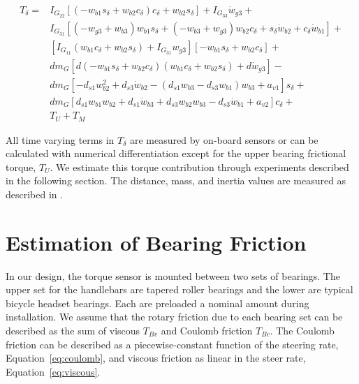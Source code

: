 \documentclass[a4paper]{article}
\begin{document}
\begin{align}
  T_{\delta} =
    & I_{G_{22}} \left[ \left( -w_{b1} s_\delta + w_{b2} c_\delta \right)
      c_\delta + w_{b2} s_\delta \right] + I_{G_{33}} \dot{w}_{g3} + \nonumber \\
    & I_{G_{31}} \left[ (-w_{g3} + w_{b3} ) w_{b1} s_\delta +
      (-w_{b3} + w_{g3}) w_{b2} c_\delta +
      s_\delta \dot{w}_{b2} + c_\delta \dot{w}_{b1} \right] + \nonumber \\
    & \left[ I_{G_{11}} (w_{b1} c_\delta + w_{b2}s_\delta) +
      I_{G_{31}} w_{g3} \right] \left[-w_{b1} s_\delta +
      w_{b2} c_\delta \right] + \nonumber \\
    & d m_G \left[ d (-w_{b1} s_\delta + w_{b2} c_\delta)
      (w_{b1} c_\delta + w_{b2} s_\delta) + d \dot{w}_{g3} \right] - \nonumber \\
    & d m_G \left[-d_{s1} w_{b2}^{2} + d_{s3} \dot{w}_{b2} -
      (d_{s1} w_{b3} - d_{s3} w_{b1}) w_{b3} + a_{v1} \right] s_\delta + \nonumber \\
    & d m_G \left[d_{s1} w_{b1} w_{b2} + d_{s1} \dot{w}_{b3} +
      d_{s3} w_{b2} w_{b3} - d_{s3} \dot{w}_{b1} + a_{v2} \right]
      c_\delta + \nonumber \\
    & T_U + T_M
\end{align}

All time varying terms in $T_\delta$ are measured by on-board sensors or can be
calculated with numerical differentiation except for the upper bearing
frictional torque, $T_U$. We estimate this torque contribution through
experiments described in the following section. The distance, mass, and inertia
values are measured as described in \cite{Moore2012}.

\section*{Estimation of Bearing Friction}
\label{sec:bearing-friction}

In our design, the torque sensor is mounted between two sets of bearings. The
upper set for the handlebars are tapered roller bearings and the lower are
typical bicycle headset bearings. Each are preloaded a nominal amount during
installation. We assume that the rotary friction due to each bearing set can be
described as the sum of viscous $T_{Bv}$ and Coulomb friction $T_{Bc}$. The
Coulomb friction can be described as a piecewise-constant function of the
steering rate, Equation~\ref{eq:coulomb}, and viscous friction as linear in the
steer rate, Equation~\ref{eq:viscous}.
\end{document}
